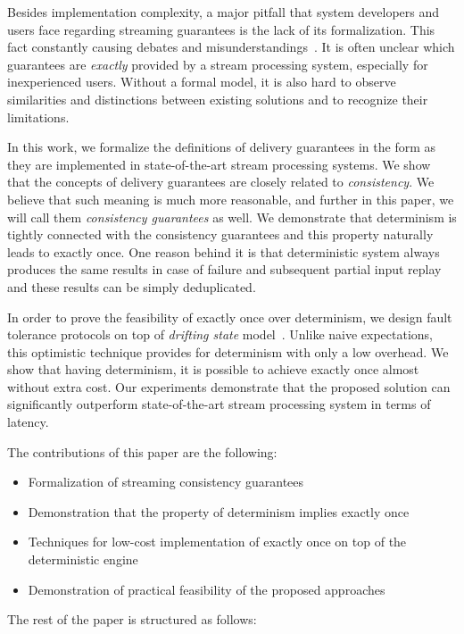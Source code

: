 Besides implementation complexity, a major pitfall that system developers and users face regarding streaming guarantees is the lack of its formalization. This fact constantly causing debates and misunderstandings~\cite{JerryPengStreamIO, PaperTrail}. It is often unclear which guarantees are {\em exactly} provided by a stream processing system, especially for inexperienced users. Without a formal model, it is also hard to observe similarities and distinctions between existing solutions and to recognize their limitations.

In this work, we formalize the definitions of delivery guarantees in the form as they are implemented in state-of-the-art stream processing systems. We show that the concepts of delivery guarantees are closely related to {\em consistency}. We believe that such meaning is much more reasonable, and further in this paper, we will call them {\em consistency guarantees} as well. We demonstrate that determinism is tightly connected with the consistency guarantees and this property naturally leads to exactly once. One reason behind it is that deterministic system always produces the same results in case of failure and subsequent partial input replay and these results can be simply deduplicated.

In order to prove the feasibility of exactly once over determinism, we design fault tolerance protocols on top of {\em drifting state} model~\cite{we2018adbis}. Unlike naive expectations, this optimistic technique provides for determinism with only a low overhead. We show that having determinism, it is possible to achieve exactly once almost without extra cost. Our experiments demonstrate that the proposed solution can significantly outperform state-of-the-art stream processing system in terms of latency.

The contributions of this paper are the following: 
\begin{itemize}
    \item Formalization of streaming consistency guarantees 
    \item Demonstration that the property of determinism implies exactly once
    \item Techniques for low-cost implementation of exactly once on top of the deterministic engine
    \item Demonstration of practical feasibility of the proposed approaches
\end{itemize}

The rest of the paper is structured as follows: 